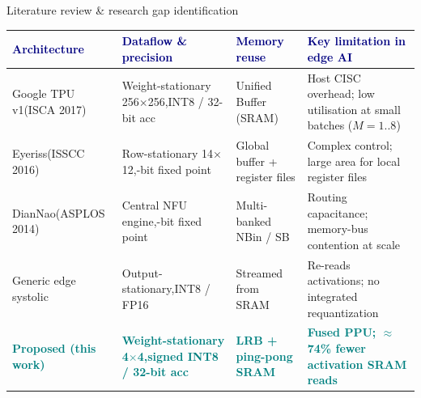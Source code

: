 \documentclass[aspectratio=169,10pt,t]{beamer}
\begin{document}
\begin{frame}{Literature review \& research gap identification}
  \scriptsize
  \renewcommand{\arraystretch}{1.35}
  \begin{tabularx}{\textwidth}{@{}p{2.45cm}p{3.35cm}p{2.75cm}>{\raggedright\arraybackslash}X@{}}
    \toprule
    \textcolor{navy}{\textbf{Architecture}} & \textcolor{navy}{\textbf{Dataflow \& precision}} &
    \textcolor{navy}{\textbf{Memory reuse}} & \textcolor{navy}{\textbf{Key limitation in edge AI}}\\
    \midrule
    Google TPU v1\newline(ISCA 2017) & Weight-stationary 256$\times$256,\newline INT8 / 32-bit acc & Unified Buffer (SRAM) &
      Host CISC overhead; low utilisation at small batches ($M{=}1..8$)\\
    Eyeriss\newline(ISSCC 2016) & Row-stationary 14$\times$12,\newline 16-bit fixed point & Global buffer + register files &
      Complex control; large area for local register files\\
    DianNao\newline(ASPLOS 2014) & Central NFU engine,\newline 16-bit fixed point & Multi-banked NBin / SB &
      Routing capacitance; memory-bus contention at scale\\
    Generic edge systolic & Output-stationary,\newline INT8 / FP16 & Streamed from SRAM &
      Re-reads activations; no integrated requantization\\
    \midrule
    \textcolor{teal}{\textbf{Proposed (this work)}} & \textcolor{teal}{\textbf{Weight-stationary 4$\times$4,\newline signed INT8 / 32-bit acc}} &
      \textcolor{teal}{\textbf{LRB + ping-pong SRAM}} &
      \textcolor{teal}{\textbf{Fused PPU; $\approx$74\% fewer activation SRAM reads}}\\
    \bottomrule
  \end{tabularx}


\end{frame}
\end{document}
